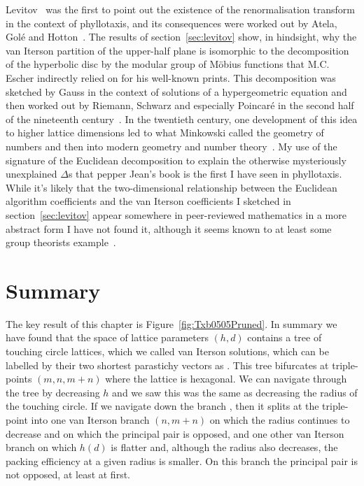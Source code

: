 Levitov~\cite{levitovFibonacciNumbersBotany1991} was the first to point out the existence of the renormalisation transform in the context of phyllotaxis, and its consequences were worked out by Atela, Golé and Hotton~\autocite{atelaDynamicalSystemPlant2002}. 
 The results of section~\ref{sec:levitov} show, in hindsight, why the van Iterson partition of the upper-half plane is isomorphic to the decomposition of the hyperbolic disc by the modular group of M{\"o}bius functions that M.C. Escher indirectly relied on for his well-known prints. This decomposition was sketched by Gauss in the context of solutions of a hypergeometric equation and then worked out by Riemann,  Schwarz and especially Poincar\'{e} in the second half of the nineteenth century~\cite{gaussBemerkungFragmentenUber2011,poincarePapersFuchsianFunctions1985,schwarzUeberDiejenigenFalle1873,johnstillwellTranslatorNotePoincare1996}. 
  In the twentieth century, one development of this idea to higher lattice dimensions led to what Minkowski called the geometry of numbers and then into modern geometry and number theory~\cite{bergerGeometryRevealedJacob2010}.
My use of the signature of the Euclidean decomposition to explain the otherwise mysteriously unexplained $\Delta$s that pepper Jean's book is the first I have seen in phyllotaxis.   While it's likely that the  two-dimensional relationship between the Euclidean algorithm coefficients and the van Iterson coefficients I sketched in section~\ref{sec:levitov} appear somewhere in peer-reviewed mathematics in a more abstract form I have not found it, although it seems known to at least some group theorists example~\cite{conradIdealClassesSL22024}.  
 

\section{Summary}
\label{sec:ClassifyingSummary}
The key result of this chapter is Figure~\ref{fig:Txb0505Pruned}. In summary we have found that the space of lattice parameters $(h,d)$ contains a tree of touching circle lattices, which we called van Iterson solutions, which can be  labelled by their two shortest parastichy vectors as . This tree bifurcates at triple-points $(m,n,m+n)$ where the lattice is hexagonal. We can navigate through the tree by decreasing $h$ and we saw this was the same as decreasing the radius of the touching circle. If we navigate down the branch , then it splits at the triple-point
into one van Iterson branch $(n,m+n)$ on which the radius continues to decrease and on which the principal pair is opposed, and one other van Iterson branch on which  $h(d)$ is flatter and, although the radius also decreases, the packing efficiency at a given radius is smaller. On this branch the principal pair is not opposed, at least at first. 


